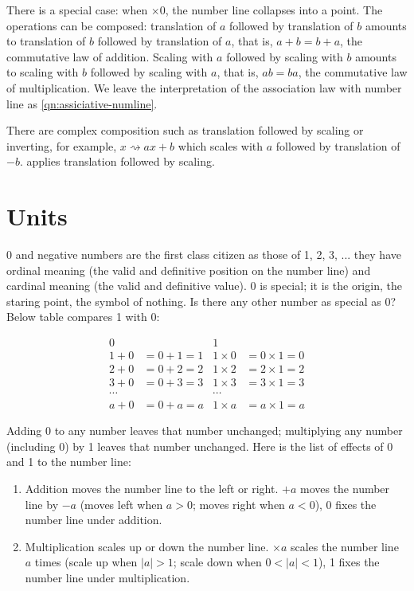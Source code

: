 \documentclass[b5paper]{article}
\begin{document}
There is a special case: when $\times 0$, the number line collapses into a point. The operations can be composed: translation of $a$ followed by translation of $b$ amounts to translation of $b$ followed by translation of $a$, that is, $a + b = b + a$, the commutative law of addition. Scaling with $a$ followed by scaling with $b$ amounts to scaling with $b$ followed by scaling with $a$, that is, $ab = ba$, the commutative law of multiplication. We leave the interpretation of the association law with number line as \cref{qn:assiciative-numline}.

There are complex composition such as translation followed by scaling or inverting, for example, $x \rightsquigarrow ax + b$ which scales with $a$ followed by translation of $-b$.  applies translation followed by scaling.

\section{Units}
 \label{sec:unit}
0 and negative numbers are the first class citizen as those of 1, 2, 3, ... they have ordinal meaning (the valid and definitive position on the number line) and  cardinal meaning (the valid and definitive value). 0 is special; it is the origin, the staring point, the symbol of nothing. Is there any other number as special as 0? Below table compares 1 with 0:

\begin{align*}
  0     &             &  1 & \\
  1 + 0 & = 0 + 1 = 1  &  1 \times 0 &= 0 \times 1 = 0 \\
  2 + 0 &= 0 + 2 = 2  &  1 \times 2  &= 2 \times 1 = 2 \\
  3 + 0 &= 0 + 3 = 3  &  1 \times 3  &= 3 \times 1 = 3 \\
  \cdots &            & \cdots & \\
  a + 0 &= 0 + a = a  &  1 \times a  &= a \times 1 =  a
\end{align*}

Adding 0 to any number leaves that number unchanged; multiplying any number (including 0) by 1 leaves that number unchanged. Here is the list of effects of 0 and 1 to the number line:

\begin{enumerate}[1)]
\item Addition moves the number line to the left or right. $+a$ moves the number line by $-a$ (moves left when $a > 0$; moves right when $a < 0$), 0 fixes the number line under addition.
\item Multiplication scales up or down the number line. $\times a$ scales the number line $a$ times (scale up when $|a| > 1$; scale down when $0 < |a| < 1$), 1 fixes the number line under multiplication.
\end{enumerate}
\end{document}

